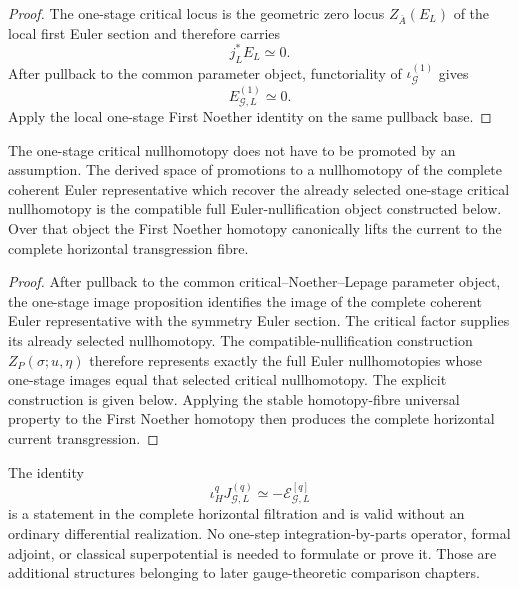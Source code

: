 \begin{proof}
The one-stage critical locus is the geometric zero locus $Z_{\overline A}(E_L)$ of the local first Euler
section and therefore carries
\[
j_L^*E_L\simeq0.
\]
After pullback to the common parameter object, functoriality of
$\iota_{\mathcal G}^{(1)}$ gives
\[
E_{\mathcal G,L}^{(1)}\simeq0.
\]
Apply the local one-stage First Noether identity on the same pullback base.
\end{proof}

\begin{proposition}
\label{prop:symmetry-noether-full-conservation-is-represented-by-euler-nullification}
The one-stage critical nullhomotopy does not have to be promoted by an assumption.
The derived space of promotions to a nullhomotopy of the complete coherent Euler
representative which recover the already selected one-stage critical nullhomotopy
is the compatible full Euler-nullification object constructed below.  Over that
object the First Noether homotopy canonically lifts the current to the complete
horizontal transgression fibre.
\end{proposition}

\begin{proof}
After pullback to the common critical--Noether--Lepage parameter object, the
one-stage image proposition identifies the image of the complete coherent Euler
representative with the symmetry Euler section.  The critical factor supplies its
already selected nullhomotopy.  The compatible-nullification construction
$Z_P(\sigma;u,\eta)$ therefore represents exactly the full Euler nullhomotopies
whose one-stage images equal that selected critical nullhomotopy.  The explicit
construction is given below.  Applying the stable homotopy-fibre universal
property to the First Noether homotopy then produces the complete horizontal
current transgression.
\end{proof}

\begin{remark}
\label{rem:symmetry-noether-first-noether-is-filtration-level}
The identity
\[
\iota_H^qJ_{\mathcal G,L}^{(q)}
\simeq
-\mathscr E_{\mathcal G,L}^{[q]}
\]
is a statement in the complete horizontal filtration and is valid without an
ordinary differential realization.  No one-step integration-by-parts operator,
formal adjoint, or classical superpotential is needed to formulate or prove it.
Those are additional structures belonging to later gauge-theoretic comparison
chapters.
\end{remark}
